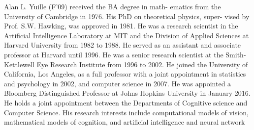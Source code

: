 \begin{IEEEbiography}{Alan L. Yuille}
(F'09) received the BA degree in math-
ematics from the University of Cambridge in
1976. His PhD on theoretical physics, super-
vised by Prof. S.W. Hawking, was approved
in 1981. He was a research scientist in the
Artificial Intelligence Laboratory at MIT and
the Division of Applied Sciences at Harvard
University  from  1982  to  1988.  He  served
as  an  assistant  and  associate  professor  at
Harvard  until  1996.  He  was  a  senior  research scientist at the Smith-Kettlewell Eye
Research Institute from 1996 to 2002. He joined the University of
California, Los Angeles, as a full professor with a joint appointment
in  statistics  and  psychology  in  2002, and computer  science  in  2007. 
He was appointed a Bloomberg Distinguished Professor at Johns Hopkins University in January 2016.
He holds a joint appointment between the Departments of Cognitive science and Computer Science. 
His  research  interests  include
computational models of vision, mathematical models of cognition,
and artificial intelligence and neural network
\end{IEEEbiography}







